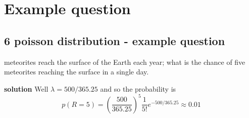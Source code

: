 
\ifind
\section*{Example question}
\else
\subsection*{6 poisson distribution - example question}
 meteorites reach the surface of the Earth each year; what is the
chance of five meteorites reaching the surface in a single day.

\noindent \textbf{solution} Well $\lambda=500/365.25$ and so the probability is
\begin{equation}
p(R=5)=\left(\frac{500}{365.25}\right)^5\frac{1}{5!}e^{-500/365.25}\approx 0.01
\end{equation}

